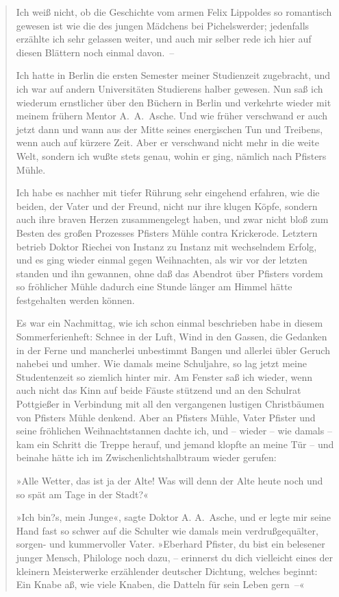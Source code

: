 \begin{verse}
Ich weiß nicht, ob die Geschichte vom armen Felix Lippoldes so
romantisch gewesen ist wie die des jungen Mädchens bei
Pichelswerder; jedenfalls erzählte ich sehr gelassen weiter, und
auch mir selber rede ich hier auf diesen Blättern noch einmal
davon.~–

Ich hatte in Berlin die ersten Semester meiner Studienzeit
zugebracht, und ich war auf andern Universitäten Studierens halber
gewesen. Nun saß ich wiederum ernstlicher über den Büchern in
Berlin und verkehrte wieder mit meinem frühern Mentor A.~A.~Asche.
Und wie früher verschwand er auch jetzt dann und wann aus der Mitte
seines energischen Tun und Treibens, wenn auch auf kürzere Zeit.
Aber er verschwand nicht mehr in die weite Welt, sondern ich wußte
stets genau, wohin er ging, nämlich nach Pfisters Mühle.

Ich habe es nachher mit tiefer Rührung sehr eingehend erfahren, wie
die beiden, der Vater und der Freund, nicht nur ihre klugen Köpfe,
sondern auch ihre braven Herzen zusammengelegt haben, und zwar
nicht bloß zum Besten des großen Prozesses Pfisters Mühle contra
Krickerode. Letztern betrieb Doktor Riechei von Instanz zu Instanz
mit wechselndem Erfolg, und es ging wieder einmal gegen
Weihnachten, als wir vor der letzten standen und ihn gewannen, ohne
daß das Abendrot über Pfisters vordem so fröhlicher Mühle dadurch
eine Stunde länger am Himmel hätte festgehalten werden können.

Es war ein Nachmittag, wie ich schon einmal beschrieben habe in
diesem Sommerferienheft: Schnee in der Luft, Wind in den Gassen,
die Gedanken in der Ferne und mancherlei unbestimmt Bangen und
allerlei übler Geruch nahebei und umher. Wie damals meine
Schuljahre, so lag jetzt meine Studentenzeit so ziemlich hinter
mir. Am Fenster saß ich wieder, wenn auch nicht das Kinn auf beide
Fäuste stützend und an den Schulrat Pottgießer in Verbindung mit
all den vergangenen lustigen Christbäumen von Pfisters Mühle
denkend. Aber an Pfisters Mühle, Vater Pfister und seine fröhlichen
Weihnachtstannen dachte ich, und – wieder – wie damals – kam ein
Schritt die Treppe herauf, und jemand klopfte an meine Tür – und
beinahe hätte ich im Zwischenlichtshalbtraum wieder gerufen:

»Alle Wetter, das ist ja der Alte! Was will denn der Alte heute
noch und so spät am Tage in der Stadt?«

»Ich bin?s, mein Junge«, sagte Doktor A. A.~Asche, und er legte mir
seine Hand fast so schwer auf die Schulter wie damals mein
verdrußgequälter, sorgen- und kummervoller Vater. »Eberhard
Pfister, du bist ein belesener junger Mensch, Philologe noch dazu,
– erinnerst du dich vielleicht eines der kleinern Meisterwerke
erzählender deutscher Dichtung, welches beginnt: Ein Knabe aß, wie
viele Knaben, die Datteln für sein Leben gern~–«


\end{verse}
